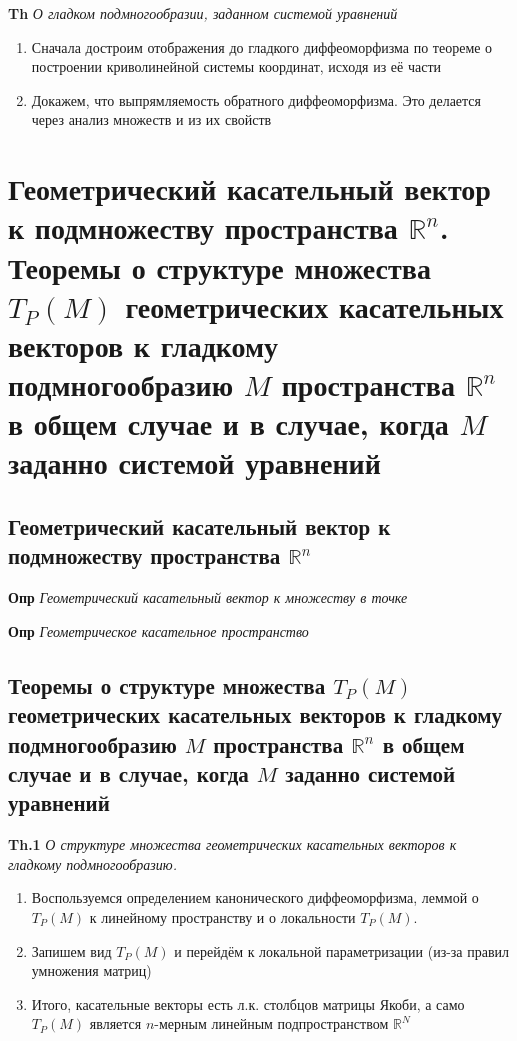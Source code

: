 \documentclass[a4paper, 14pt]{article}
\begin{document}
    \textbf{Th} \textit{О гладком подмногообразии, заданном системой уравнений}
    
    \begin{enumerate}
        \item Сначала достроим отображения до гладкого диффеоморфизма по теореме о построении криволинейной системы
        координат, исходя из её части
        \item Докажем, что выпрямляемость обратного диффеоморфизма.
        Это делается через анализ множеств и из их свойств
    \end{enumerate}
    
    \section{Геометрический касательный вектор к подмножеству пространства $\mathbb{R}^n$.
    Теоремы о структуре множества $T_P (M)$ геометрических касательных векторов к гладкому подмногообразию $M$
        пространства $\mathbb{R}^n$ в общем случае и в случае, когда $M$ заданно системой уравнений}
    
    \subsection{Геометрический касательный вектор к подмножеству пространства $\mathbb{R}^n$}
    
    \textbf{Опр} \textit{Геометрический касательный вектор к множеству в точке}
    
    \textbf{Опр} \textit{Геометрическое касательное пространство}
    
    \subsection{Теоремы о структуре множества $T_P (M)$ геометрических касательных векторов к гладкому
    подмногообразию $M$ пространства $\mathbb{R}^n$ в общем случае и в случае, когда $M$ заданно системой уравнений}
    
    \textbf{Th.1} \textit{О структуре множества геометрических касательных векторов к гладкому подмногообразию.}
    
    \begin{enumerate}
        \item Воспользуемся определением канонического диффеоморфизма, леммой о $T_P (M)$ к линейному пространству и
        о локальности $T_P (M)$.
        \item Запишем вид $T_P (M)$ и перейдём к локальной параметризации (из-за правил умножения матриц)
        \item Итого, касательные векторы есть л.к. столбцов матрицы Якоби, а само $T_P (M)$ является $n$-мерным
        линейным подпространством $\mathbb{R}^N$
    \end{enumerate}
    
\end{document}
